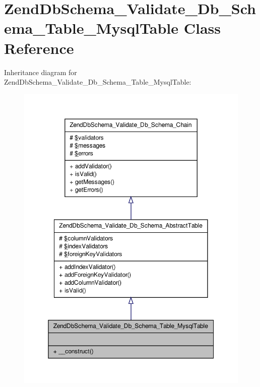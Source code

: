 \hypertarget{classZendDbSchema__Validate__Db__Schema__Table__MysqlTable}{\section{\-Zend\-Db\-Schema\-\_\-\-Validate\-\_\-\-Db\-\_\-\-Schema\-\_\-\-Table\-\_\-\-Mysql\-Table \-Class \-Reference}
\label{classZendDbSchema__Validate__Db__Schema__Table__MysqlTable}
}


\-Inheritance diagram for \-Zend\-Db\-Schema\-\_\-\-Validate\-\_\-\-Db\-\_\-\-Schema\-\_\-\-Table\-\_\-\-Mysql\-Table\-:\nopagebreak
\begin{figure}[H]
\begin{center}
\leavevmode
\includegraphics[width=350pt]{classZendDbSchema__Validate__Db__Schema__Table__MysqlTable__inherit__graph}
\end{center}
\end{figure}


